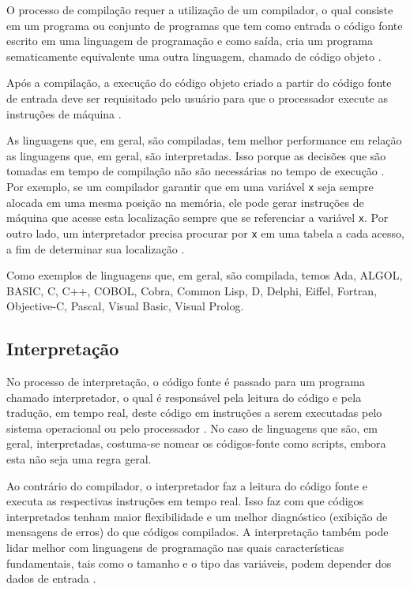 O processo de compilação requer a utilização de um compilador, o qual consiste
 em um programa ou conjunto de programas  que tem como entrada o código fonte 
escrito em uma linguagem de programação e como saída, cria um programa sematicamente 
equivalente uma outra linguagem, chamado de código objeto \cite[pág. 2]{ref4}.

Após a compilação, a execução do código objeto criado a partir do
 código fonte de entrada deve ser requisitado pelo usuário para que o processador 
execute as instruções de máquina \cite[pág. 17]{ref6}.

As linguagens que, em geral, são compiladas, tem melhor performance em relação
 as linguagens que, em geral, são interpretadas. Isso porque as decisões que são
 tomadas em tempo de compilação não são necessárias no tempo de execução \cite[pág. 2]{ref3}.
Por exemplo, se um compilador garantir que em uma variável \texttt{x} seja sempre alocada 
em uma mesma posição na memória,  ele pode gerar instruções de máquina que 
acesse esta localização sempre que se referenciar a variável \texttt{x}. 
Por outro lado, um interpretador precisa procurar por \texttt{x} em uma tabela a cada 
acesso, a fim de determinar sua localização \cite[pág. 167]{ref2}.

Como exemplos de linguagens que, em geral, são compilada, temos Ada, ALGOL, 
BASIC, C, C++, COBOL, Cobra, Common Lisp, D, Delphi, Eiffel, Fortran, 
Objective-C, Pascal, Visual Basic, Visual Prolog.

\subsection{Interpretação}

No processo de interpretação, o código fonte é passado para um programa chamado
 interpretador, o qual é responsável pela leitura do código e pela tradução, 
em tempo real, deste código em instruções a serem executadas pelo sistema 
operacional ou  pelo processador \cite{ref2}. No caso de linguagens que são, em geral, 
interpretadas, costuma-se nomear os códigos-fonte como scripts, embora esta não seja 
uma regra geral.

Ao contrário do compilador, o interpretador faz a leitura do código fonte e 
executa  as respectivas instruções em tempo real. Isso faz com que  códigos 
interpretados tenham maior flexibilidade e um melhor diagnóstico (exibição de 
mensagens de erros) do que  códigos compilados. A interpretação também pode lidar 
melhor com linguagens de programação nas quais características fundamentais, 
tais como  o tamanho e  o tipo das variáveis, podem depender dos dados de 
entrada \cite[pág. 17]{ref6}.

